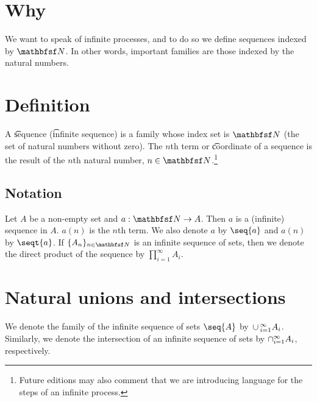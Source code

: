 

\section*{Why}

We want to speak of infinite processes, and to do so we define sequences indexed by $\N$.
In other words, important families are those indexed by the natural numbers.

\section*{Definition}

A \t{sequence} (\t{infinite sequence}) is a family whose index set is $\N $ (the set of natural numbers without zero).
The \t{$n$th term} or \t{coordinate} of a sequence is the result of the $n$th natural number, $n \in \N $.\footnote{Future editions may also comment that we are introducing language for the steps of an infinite process.}

\subsection*{Notation}

Let $A$ be a non-empty set and $a: \N  \to A$.
Then $a$ is a (infinite) sequence in $A$.
$a(n)$ is the $n$th term.
We also denote $a$ by $\seq{a}$ and $a(n)$ by $\seqt{a}$.
If $\set{A_n}_{n \in \N }$ is an infinite sequence of sets, then we denote the direct product of the sequence by $\prod_{i = 1}^{\infty} A_i$.

\section*{Natural unions and intersections}

We denote the family of the infinite sequence of sets $\seq{A}$ by $\,\cup\,_{i = 1}^{\infty} A_i$.
Similarly, we denote the intersection of an infinite sequence of sets by $\cap_{i = 1}^{\infty} A_i$, respectively.

\blankpage